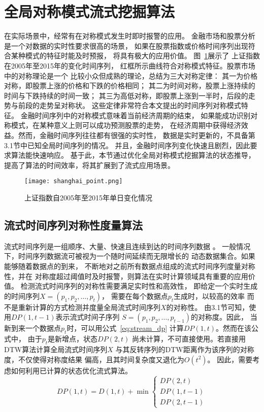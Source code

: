 \section{全局对称模式流式挖掘算法}
在实际场景中，经常有在对称模式发生时即时报警的应用\cite{2022968}。
金融市场和股票分析是一个对数据的实时性要求很高的场景，
如果在股票指数或价格时间序列出现符合某种模式的特征时能及时预报，
将具有极大的应用价值\cite{DBLP:journals/jucs/BeheraDRMD20}。
图~\ref{fig:shanghai_point}展示了
上证指数在2005年至2015年的变化时间序列，
红框所示曲线符合对称模式特征。股票市场中的对称理论是一个
比较小众但成熟的理论，总结为三大对称定律：
其一为价格对称，即股票上涨的价格和下跌的价格相同；
其二为时间对称，股票上涨持续的时间与下跌持续的时间一致；
其三为高低对称，即股票上涨到一半时，后段的走势与前段的走势呈对称状。
这些定律非常符合本文提出的时间序列对称模式特征。
金融时间序列中的对称模式意味着当前经济周期的结束，
如果能成功识别对称模式，在某种意义上则可以成功预测股票的走势，
在经济周期中获得经济效益。然而，金融时间序列往往都有很强的实时性，
数据是实时更新的，不具备第3.1节中已知全局时间序列的情况。
并且，金融时间序列变化快速且剧烈，因此要求算法能快速响应。
基于此，本节通过优化全局对称模式挖掘算法的状态推导，
提高了算法的时间效率，将其扩展到了流式应用场景。
\begin{figure}
  \centering
  \texttt{[image: shanghai\_point.png]}
  \caption{上证指数自2005年至2015年单日变化情况}
  \label{fig:shanghai_point}
\end{figure}

\subsection{流式时间序列对称性度量算法}
流式时间序列是一组顺序、大量、快速且连续到达的时间序列数据
\cite{DBLP:conf/apweb/KangWWDW18}。
一般情况下，时间序列数据流可被视为一个随时间延续而无限增长的
动态数据集合。如果能够随着数据点的到来，
不断地对之前所有数据点组成的流式时间序列度量对称性，并在
对称度超过阈值时及时报警，则算法在实时计算领域具有重要的应用价值。
检测流式时间序列的对称性需要满足实时性和高效性，
即给定一个实时生成的时间序列$X=(p_1,p_2,\dots,p_t)$，
需要在每个数据点$p_t$生成时，以较高的效率
而不是重新计算的方式检测并度量全局流式时间序列$X$的对称性。
由3.1节可知，使用$DP\left(1,t-1\right)$表示流式时间子序列
$S=(p_1,p_2,\dots,p_{t-1} )$的对称度。因此，
当新到来一个数据点$p_{t}$时，可以用公式~\ref{eq:stream_dp}
计算$DP\left(1,t\right)$。然而在该公式中，
由于$p_{t}$是新增点，状态$DP\left(2,t\right)$
尚未计算，不可直接使用。若直接用DTW算法计算全局流式时间序列$X$
与其反转序列的DTW距离作为该序列的对称度，不仅使得对称度结果
偏高，且其时间复杂度又退化为$O\left(t^2\right)$。
因此，需要考虑如何利用已计算的状态优化流式算法。
\begin{equation}
  DP(1, t)=D(1, t)+\min \left\{\begin{array}{c}
    D P(2, t) \\
    D P(1, t-1) \\
    D P(2, t-1)
    \end{array}\right.
  \label{eq:stream_dp}
\end{equation}

